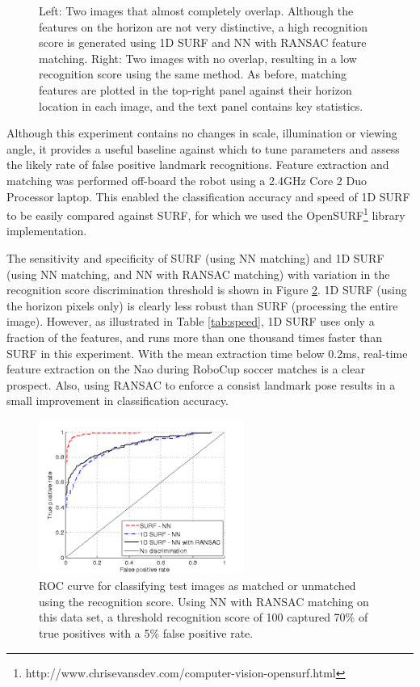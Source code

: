 \documentclass[runningheads,a4paper]{llncs}
\begin{document}
\begin{figure} [h]
\begin{minipage}[b]{0.5\textwidth}
\end{minipage}
\caption{Left: Two images that almost completely overlap. Although the features on the horizon are not very distinctive, a high recognition score is generated using 1D SURF and NN with RANSAC feature matching. Right: Two images with no overlap, resulting in a low recognition score using the same method. As before, matching features are plotted in the top-right panel against their horizon location in each image, and the text panel contains key statistics.}\label{fig:goodbad}
\end{figure}

Although this experiment contains no changes in scale, illumination or viewing angle, it provides a useful baseline against which to tune parameters and assess the likely rate of false positive landmark recognitions.  Feature extraction and matching was performed off-board the robot using a 2.4GHz Core 2 Duo Processor laptop. This enabled the classification accuracy and speed of 1D SURF to be easily compared against SURF, for which we used the OpenSURF\footnote{http://www.chrisevansdev.com/computer-vision-opensurf.html} library implementation. 

The sensitivity and specificity  of SURF (using NN matching) and 1D SURF (using NN matching, and NN with RANSAC matching) with variation in the recognition score discrimination threshold is shown in Figure \ref{fig:ROC}. 1D SURF (using the horizon pixels only) is clearly less robust than SURF (processing the entire image). However, as illustrated in Table \ref{tab:speed}, 1D SURF uses only a fraction of the features, and runs more than one thousand times faster than SURF in this experiment. With the mean extraction time below 0.2ms, real-time feature extraction on the Nao during RoboCup soccer matches is a clear prospect. Also, using RANSAC to enforce a consist landmark pose results in a small improvement in classification accuracy.

\begin{figure} [h]
\centering
\includegraphics[width=0.6\textwidth]{figures/ROC}
\caption{ROC curve for classifying test images as matched or unmatched using the recognition score. Using NN with RANSAC matching on this data set, a threshold recognition score of 100 captured 70\% of true positives with a 5\% false positive rate. } \label{fig:ROC}
\end{figure}
\end{document}
